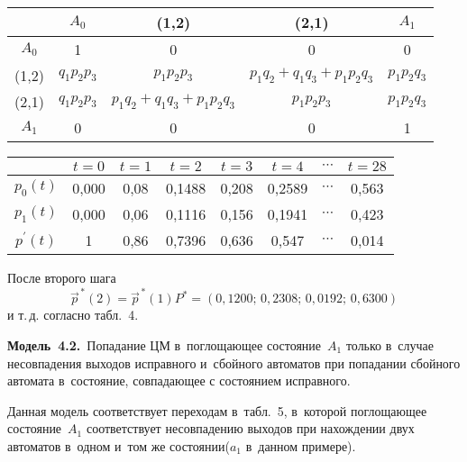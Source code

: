 \begin{multicols}{2}
\begin{table*}[b]
\begin{center}
\begin{tabular}{|c|c|c|c|c|}
\hline
&$A_0$ & (1,2) & (2,1) & $A_1$\\
\hline
$A_0$ & 1 & 0 & 0 &0\\
(1,2) & $q_1p_2p_3$ &  $p_1p_2p_3$ & $p_1q_2+q_1q_3+p_1p_2q_3$ & $p_1p_2q_3$\\
(2,1) &  $q_1p_2p_3$ & $p_1q_2+q_1q_3+p_1p_2q_3$ &  $p_1p_2p_3$ & $p_1p_2q_3$\\
$A_1$ & 0&0&0&1\\
\hline
\end{tabular}
\end{center}
\begin{center}
\parbox{340pt}{

}

\vspace*{2ex}

\tabcolsep=10.5pt
\begin{tabular}{|c|c|c|c|c|c|c|c|}
\hline
&$t=0$ & $t=1$ & $t=2$ & $t=3$ &$ t=4$ &$\cdots$&$t=28$\\
\hline
$p_0(t)$ &0,000&0,08&0,1488&0,208&0,2589&$\cdots$&0,563\\
$p_1(t)$ &0,000&0,06&0,1116&0,156&0,1941&$\cdots$&0,423\\
$p^\prime(t)$ &1\hphantom{,000}&0,86&0,7396&0,636&0,547\hphantom{9}&$\cdots$&0,014\\
\hline
\end{tabular}
\end{center}
\end{table*}

     
     После второго шага
     $$
     \vec{p}^{\,*}(2) =\vec{p}^{\,*}(1) P^*= \left( 0{,}1200;\, 
0{,}2308;\,0{,}0192;\,0{,}6300\right)
     $$
и т.\,д. согласно табл.~4.



     
     \smallskip
     
     \noindent
     \textbf{Модель~4.2.}\ Попадание ЦМ в~поглощающее 
состояние~$A_1$ только в~случае несовпадения выходов исправного 
и~сбойного автоматов при попадании сбойного автомата в~состояние, 
совпа\-да\-ющее с состоянием исправного. 
     
     \smallskip
     
     Данная модель соответствует переходам в~табл.~5, в~которой 
поглощающее состояние~$A_1$ соответствует несовпадению выходов при 
нахождении двух автоматов в~одном и~том же состоянии\linebreak ($a_1$ в~данном 
примере).



\end{multicols}
